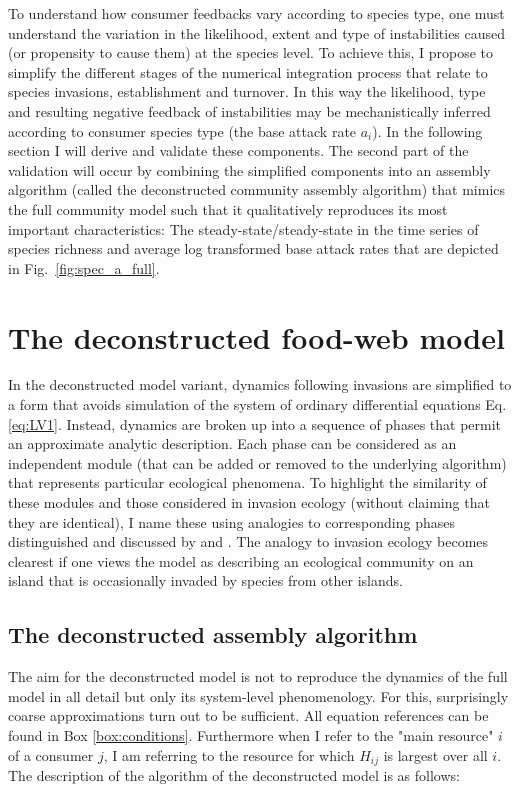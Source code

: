 \documentclass[a4paper]{report}
\begin{document}
 To understand how consumer feedbacks vary according to species type, one must understand the variation in the likelihood, extent and type of instabilities caused (or propensity to cause them) at the species level. To achieve this, I propose to simplify the different stages of the numerical integration process that relate to species invasions, establishment and turnover. In this way the likelihood, type and resulting negative feedback of instabilities may be mechanistically inferred according to consumer species type (the base attack rate $a_i$). In the following section I will derive and validate these components. The second part of the validation will occur by combining the simplified components into an assembly algorithm (called the deconstructed community assembly algorithm) that mimics the full community model such that it qualitatively reproduces its most important characteristics: The steady-state/steady-state in the time series of species richness and average log transformed base attack rates that are depicted in Fig.~\ref{fig:spec_a_full}. 
 
\section{The deconstructed food-web model}
\label{sec:deconstr-food-web}

In the deconstructed model variant, dynamics following invasions are simplified to a form that avoids simulation of the system of ordinary differential equations Eq. \eqref{eq:LV1}. Instead, dynamics are broken
up into a sequence of phases that permit an approximate analytic description. Each phase can be considered as an independent module (that can be added or removed to the underlying algorithm) that represents particular ecological phenomena. To highlight the similarity of these modules and those considered in invasion ecology (without claiming that they are identical), I name these using analogies to corresponding phases
distinguished and discussed by \citep{Lockwood13:_InvasionEcology} and \citep{Reise06:_AreAliens}. The analogy to invasion ecology becomes clearest if one views the model as describing an ecological community on an island that is occasionally invaded by species from other islands.
\subsection{The deconstructed assembly algorithm}

The aim for the deconstructed model is not to reproduce the dynamics of the full model in all detail but only its system-level phenomenology. For this, surprisingly coarse approximations turn out to be sufficient. All equation references can be found in Box \ref{box:conditions}. Furthermore when I refer to the "main resource" $i$ of a consumer $j$, I am referring to the resource for which $H_{ij}$ is largest over all $i$. The description of the algorithm of the deconstructed
model is as follows:
\end{document}
